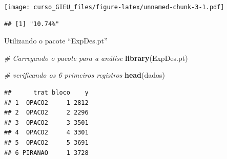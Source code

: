 \documentclass[
]{book}
\newenvironment{Shaded}{\begin{snugshade}}{\end{snugshade}}
\newcommand{\CommentTok}[1]{\textcolor[rgb]{0.56,0.35,0.01}{\textit{#1}}}
\newcommand{\DataTypeTok}[1]{\textcolor[rgb]{0.13,0.29,0.53}{#1}}
\newcommand{\DecValTok}[1]{\textcolor[rgb]{0.00,0.00,0.81}{#1}}
\newcommand{\KeywordTok}[1]{\textcolor[rgb]{0.13,0.29,0.53}{\textbf{#1}}}
\newcommand{\NormalTok}[1]{#1}
\newcommand{\OperatorTok}[1]{\textcolor[rgb]{0.81,0.36,0.00}{\textbf{#1}}}
\newcommand{\StringTok}[1]{\textcolor[rgb]{0.31,0.60,0.02}{#1}}
\begin{document}
\texttt{[image: curso\_GIEU\_files/figure-latex/unnamed-chunk-3-1.pdf]}

\begin{Shaded}
\end{Shaded}

\begin{verbatim}
## [1] "10.74%"
\end{verbatim}

Utilizando o pacote ``ExpDes.pt''

\begin{Shaded}
\begin{Highlighting}[]
\CommentTok{# Carregando o pacote para a análise}
\KeywordTok{library}\NormalTok{(ExpDes.pt)}

\CommentTok{# verificando os 6 primeiros registros}
\KeywordTok{head}\NormalTok{(dados)}
\end{Highlighting}
\end{Shaded}

\begin{verbatim}
##      trat bloco    y
## 1  OPACO2     1 2812
## 2  OPACO2     2 2296
## 3  OPACO2     3 3501
## 4  OPACO2     4 3301
## 5  OPACO2     5 3691
## 6 PIRANAO     1 3728
\end{verbatim}

\begin{Shaded}
\end{Shaded}
\end{document}
